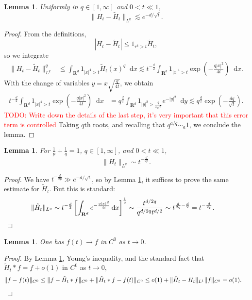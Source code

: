 \documentclass[reqno,11pt]{amsart}
\newcommand{\RR}{\mathbf{R}}
\newcommand*\dif{\mathop{}\!\mathrm{d}}
\newtheorem{lemma}[theorem]{Lemma}
\theoremstyle{definition}
\numberwithin{equation}{section}
\newcommand\todo[1]{\textcolor{red}{TODO: #1}}
\begin{document}
\begin{lemma}\label{approximation by heat kernels}
Uniformly in $q \in [1, \infty]$ and $0 < t \ll 1$,
$$\|H_t - \tilde H_t\|_{L^q} \lesssim e^{-d/\sqrt t}.$$
\end{lemma}
\begin{proof}
From the definitions,
$$|H_t - \tilde H_t| \leq 1_{r^4 > t} \tilde H_t,$$
so we integrate 
\begin{align*}
\|H_t - \tilde H_t\|_{L^q}^q
&\leq \int_{\RR^d} 1_{|x|^4 > t} \tilde H_t(x)^q \dif x \lesssim t^{-\frac{d}{2}} \int_{\RR^d} 1_{|x|^4 > t} \exp\left(-\frac{q|x|^2}{4t}\right) \dif x.
\end{align*}
With the change of variables $y = x \sqrt{\frac{q}{4t}}$, we obtain 
\begin{align*}
t^{-\frac{d}{2}} \int_{\RR^d} 1_{|x|^4 > t} \exp\left(-\frac{q|x|^2}{4t}\right) \dif x
&= q^{\frac{d}{2}} \int_{\RR^d} 1_{|y|^2 > \frac{q}{4\sqrt t}} e^{-|y|^2} \dif y \lesssim q^{\frac{d}{2}} \exp\left(-\frac{dq}{\sqrt t}\right).
\end{align*}
\todo{Write down the details of the last step, it's very important that this error term is controlled}
Taking $q$th roots, and recalling that $q^{a/q} \sim_a 1$, we conclude the lemma.
\end{proof}

\begin{lemma}
For $\frac{1}{p} + \frac{1}{q} = 1$, $q \in [1, \infty]$, and $0 < t \ll 1$,
$$\|H_t\|_{L^q} \sim t^{-\frac{d}{2p}}.$$
\end{lemma}
\begin{proof}
We have $t^{-\frac{d}{2p}} \gg e^{-d/\sqrt t}$, so by Lemma \ref{approximation by heat kernels}, it suffices to prove the same estimate for $\tilde H_t$. But this is standard:
\begin{align*}
\|\tilde H_t\|_{L^q} &\sim t^{-\frac{d}{2}} \left[\int_{\RR^d} e^{-\frac{q|x|^2}{4t}} \dif x\right]^{\frac{1}{q}} \sim \frac{t^{d/2q}}{q^{d/2q}t^{d/2}} \sim t^{\frac{d}{2q} - \frac{d}{2}} = t^{-\frac{d}{2p}}. \qedhere
\end{align*}
\end{proof}

\begin{lemma}
One has $f(t) \to f$ in $C^0$ as $t \to 0$.
\end{lemma}
\begin{proof}
By Lemma \ref{approximation by heat kernels}, Young's inequality, and the standard fact that $\tilde H_t * f = f + o(1)$ in $C^0$ as $t \to 0$,
\begin{align*}
\|f - f(t)\|_{C^0}
& \leq \|f - \tilde H_t * f\|_{C^0} + \|\tilde H_t * f - f(t)\|_{C^0} \leq o(1) + \|\tilde H_t - H_t\|_{L^1} \|f\|_{C^0} = o(1). \qedhere
\end{align*}
\end{proof}
\end{document}
